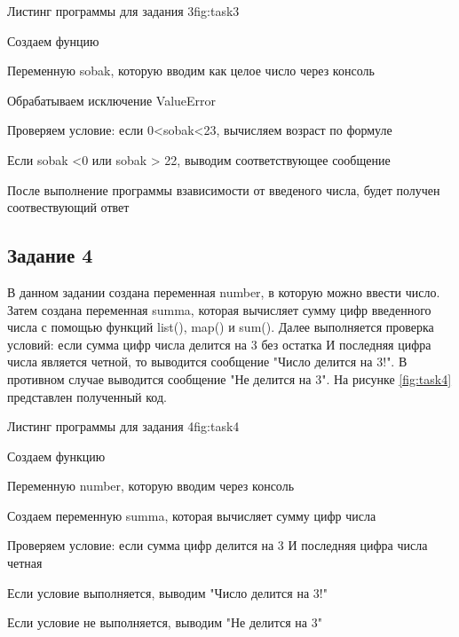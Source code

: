 \documentclass{vvsu}
\begin{document}
\begin{vvsu_figure}{Листинг программы для задания 3}{fig:task3}
    \begin{minipage}{.75\textwidth}
        
    \end{minipage}
\end{vvsu_figure}

\begin{vvsu_list}
    \item Создаем фунцию
    \item Переменную sobak, которую вводим как целое число через консоль
    \item Обрабатываем исключение ValueError
    \item Проверяем условие: если 0<sobak<23, вычисляем возраст по формуле
    \item Если sobak <0 или sobak > 22, выводим соответствующее сообщение
\end{vvsu_list}

После выполнение программы взависимости от введеного числа, будет получен соотвествующий ответ

\subsection{Задание 4}
В данном задании создана переменная number, в которую можно ввести число. Затем создана переменная summa, которая вычисляет сумму цифр введенного числа с помощью функций list(), map() и sum(). Далее выполняется проверка условий: если сумма цифр числа делится на 3 без остатка И последняя цифра числа является четной, то выводится сообщение "Число делится на 3!". В противном случае выводится сообщение "Не делится на 3". На рисунке \ref{fig:task4} представлен полученный код.

\begin{vvsu_figure}{Листинг программы для задания 4}{fig:task4}
    \begin{minipage}{.75\textwidth}
        
    \end{minipage}
\end{vvsu_figure}

\begin{vvsu_list}
\item Создаем функцию 
\item Переменную number, которую вводим через консоль
\item Создаем переменную summa, которая вычисляет сумму цифр числа
\item Проверяем условие: если сумма цифр делится на 3 И последняя цифра числа четная
\item Если условие выполняется, выводим "Число делится на 3!"
\item Если условие не выполняется, выводим "Не делится на 3"
\end{vvsu_list}
\end{document}
